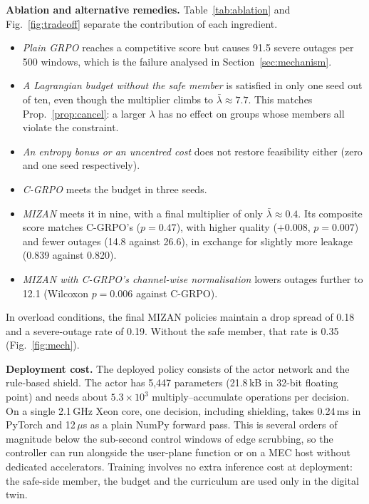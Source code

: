 \documentclass[conference]{IEEEtran}
\begin{document}
\textbf{Ablation and alternative remedies.} Table~\ref{tab:ablation} and Fig.~\ref{fig:tradeoff} separate the contribution of each ingredient.
\begin{itemize}
\item \emph{Plain GRPO} reaches a competitive score but causes 91.5 severe outages per 500 windows, which is the failure analysed in Section~\ref{sec:mechanism}.
\item \emph{A Lagrangian budget without the safe member} is satisfied in only one seed out of ten, even though the multiplier climbs to $\bar\lambda\approx7.7$. This matches Prop.~\ref{prop:cancel}: a larger $\lambda$ has no effect on groups whose members all violate the constraint.
\item \emph{An entropy bonus or an uncentred cost} does not restore feasibility either (zero and one seed respectively).
\item \emph{C-GRPO} meets the budget in three seeds.
\item \emph{MIZAN} meets it in nine, with a final multiplier of only $\bar\lambda\approx0.4$. Its composite score matches C-GRPO's ($p=0.47$), with higher quality ($+0.008$, $p=0.007$) and fewer outages (14.8 against 26.6), in exchange for slightly more leakage (0.839 against 0.820).
\item \emph{MIZAN with C-GRPO's channel-wise normalisation} lowers outages further to 12.1 (Wilcoxon $p=0.006$ against C-GRPO).
\end{itemize}
In overload conditions, the final MIZAN policies maintain a drop spread of 0.18 and a severe-outage rate of 0.19. Without the safe member, that rate is 0.35 (Fig.~\ref{fig:mech}).

\textbf{Deployment cost.} The deployed policy consists of the actor network and the rule-based shield. The actor has 5{,}447 parameters (21.8\,kB in 32-bit floating point) and needs about $5.3\times10^{3}$ multiply--accumulate operations per decision. On a single 2.1\,GHz Xeon core, one decision, including shielding, takes 0.24\,ms in PyTorch and 12\,$\mu$s as a plain NumPy forward pass. This is several orders of magnitude below the sub-second control windows of edge scrubbing, so the controller can run alongside the user-plane function or on a MEC host without dedicated accelerators. Training involves no extra inference cost at deployment: the safe-side member, the budget and the curriculum are used only in the digital twin.
\end{document}

